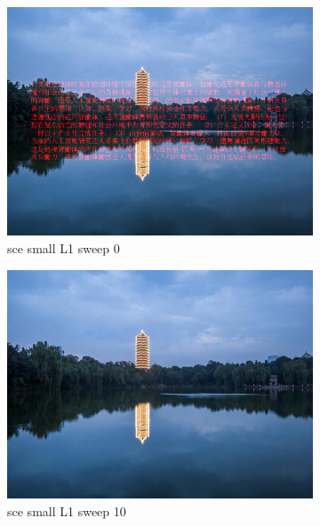 \documentclass[11pt]{article}
\begin{document}
\begin{figure}[ht!]
    \centering
    \hfill%
    \begin{subfigure}[]{0.333\linewidth}
        \centering
        \includegraphics[width=\linewidth]{fig/restoration/sce_small/L1/gibbs_0.jpg}
        \caption{sce small L1 sweep 0}
    \end{subfigure}%
    \hfill%
    \begin{subfigure}[]{0.333\linewidth}
        \centering
        \includegraphics[width=\linewidth]{fig/restoration/sce_small/L1/gibbs_10.jpg}
        \caption{sce small L1 sweep 10}
    \end{subfigure}%
    \hfill%
    \begin{subfigure}[]{0.333\linewidth}

\end{subfigure}
\end{figure}
\end{document}
